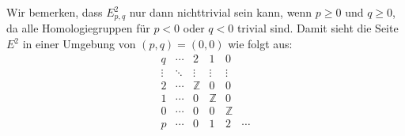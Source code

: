 \documentclass[12pt]{article}
\numberwithin{conj}{section}
\begin{document}
    Wir bemerken, dass $E^{2}_{p,q}$ nur dann nichttrivial sein kann, wenn
    $p \geq 0$ und $q \geq 0$, da alle Homologiegruppen für $p < 0$ oder $q < 0$ trivial
    sind. Damit sieht die Seite $E^{2}$ in einer Umgebung von $(p,q) = (0,0)$ wie
    folgt aus:
    \[
        \begin{array}{c|c|c|c|c|c}
            q      & \cdots & 2          & 1          & 0          &        \\
            \hline
            \vdots & \ddots & \vdots     & \vdots     & \vdots     &        \\
            2      & \cdots & \mathbb{Z} & 0          & 0          &        \\
            1      & \cdots & 0          & \mathbb{Z} & 0          &        \\
            0      & \cdots & 0          & 0          & \mathbb{Z} &        \\
            \hline
            p      & \cdots & 0          & 1          & 2          & \cdots
        \end{array}
    \]
\end{document}
